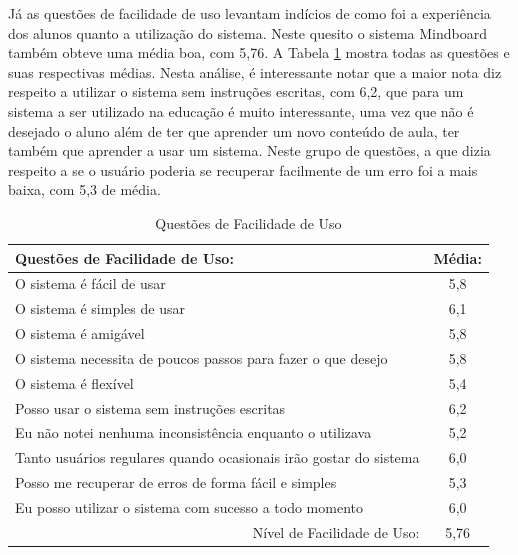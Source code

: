 Já as questões de facilidade de uso levantam indícios de como foi a experiência dos alunos quanto a utilização do sistema. Neste quesito o sistema Mindboard também obteve uma média boa, com 5,76. A Tabela \ref{tab:use_utilidade} mostra todas as questões e suas respectivas médias.
Nesta análise, é interessante notar que a maior nota diz respeito a utilizar o sistema sem instruções escritas, com 6,2, que para um sistema a ser utilizado na educação é muito interessante, uma vez que não é desejado o aluno além de ter que aprender um novo conteúdo de aula, ter também que aprender a usar um sistema. Neste grupo de questões, a que dizia respeito a se o usuário poderia se recuperar facilmente de um erro foi a mais baixa, com 5,3 de média.


\begin{table}[]
\centering
\caption{Questões de Facilidade de Uso}
\label{tab:use_utilidade}
\begin{tabular}{@{}|l|c|@{}}
\hline
Questões de Facilidade de Uso:                                                   & \multicolumn{1}{l|}{Média:} \\ \hline
O sistema é fácil de usar                                    & 5,8                         \\ \hline
O sistema é simples de usar                                  & 6,1                         \\ \hline
O sistema é amigável                                                         & 5,8                            \\ \hline
O sistema necessita de poucos passos para fazer o que desejo                   & 5,8                            \\ \hline
O sistema é flexível & 5,4                            \\ \hline
Posso usar o sistema sem instruções escritas                                & 6,2                            \\ \hline
Eu não notei nenhuma inconsistência enquanto o utilizava                       &5,2                             \\ \hline
Tanto usuários regulares quando ocasionais irão gostar do sistema                       &6,0                             \\ \hline
Posso me recuperar de erros de forma fácil e simples                       &5,3                             \\ \hline
Eu posso utilizar o sistema com sucesso a todo momento                       &6,0                             \\ \hline
\multicolumn{1}{|r|}{Nível de Facilidade de Uso:}                                & 5,76      \\ \hline
\end{tabular}
\end{table}

